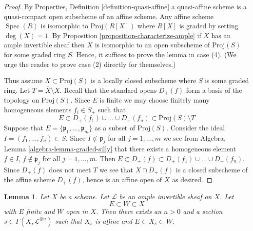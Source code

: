 \documentclass{stacks-project}
\theoremstyle{plain}
\newtheorem{lemma}[subsection]{Lemma}
\theoremstyle{definition}
\theoremstyle{remark}
\numberwithin{equation}{subsection}
\def\Spec{\mathop{\mathrm{Spec}}}
\begin{document}
\begin{proof}
By Properties, Definition \ref{definition-quasi-affine}
a quasi-affine scheme is a quasi-compact open subscheme
of an affine scheme. Any affine scheme $\Spec(R)$ is isomorphic to
$\text{Proj}(R[X])$ where $R[X]$ is graded by setting $\deg(X) = 1$.
By Proposition \ref{proposition-characterize-ample}
if $X$ has an ample invertible sheaf then $X$ is isomorphic to an open
subscheme of $\text{Proj}(S)$ for some graded ring $S$.
Hence, it suffices to prove the lemma in case (4).
(We urge the reader to prove case (2) directly for themselves.)

\medskip\noindent
Thus assume $X \subset \text{Proj}(S)$ is a locally closed subscheme
where $S$ is some graded ring. Let $T = \overline{X} \setminus X$.
Recall that the standard opens $D_{+}(f)$ form a basis of the
topology on $\text{Proj}(S)$. Since $E$ is finite we may choose finitely many
homogeneous elements $f_i \in S_{+}$ such that
$$
E \subset
D_{+}(f_1) \cup \ldots \cup D_{+}(f_n) \subset
\text{Proj}(S) \setminus T
$$
Suppose that $E = \{\mathfrak p_1, \ldots, \mathfrak p_m\}$
as a subset of $\text{Proj}(S)$.
Consider the ideal $I = (f_1, \ldots, f_n) \subset S$.
Since $I \not \subset \mathfrak p_j$ for all $j = 1, \ldots, m$
we see from Algebra, Lemma \ref{algebra-lemma-graded-silly} that
there exists a homogeneous element $f \in I$, $f \not \in \mathfrak p_j$
for all $j = 1, \ldots, m$. Then $E \subset D_{+}(f) \subset
D_{+}(f_1) \cup \ldots \cup D_{+}(f_n)$. Since $D_{+}(f)$ does not
meet $T$ we see that $X \cap D_{+}(f)$ is a closed subscheme of the
affine scheme $D_{+}(f)$, hence is an affine open of $X$ as desired.
\end{proof}

\begin{lemma}
\label{lemma-ample-finite-set-in-principal-affine}
Let $X$ be a scheme. Let $\mathcal{L}$ be an ample invertible sheaf on $X$.
Let
$$
E \subset W \subset X
$$
with $E$ finite and $W$ open in $X$. Then there exists an $n > 0$
and a section $s \in \Gamma(X, \mathcal{L}^{\otimes n})$ such that
$X_s$ is affine and $E \subset X_s \subset W$.
\end{lemma}
\end{document}
